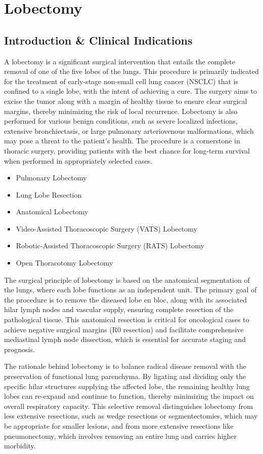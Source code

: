 \chapter{Lobectomy}

\section*{Introduction \& Clinical Indications}
A lobectomy is a significant surgical intervention that entails the complete removal of one of the five lobes of the lungs. This procedure is primarily indicated for the treatment of early-stage non-small cell lung cancer (NSCLC) that is confined to a single lobe, with the intent of achieving a cure. The surgery aims to excise the tumor along with a margin of healthy tissue to ensure clear surgical margins, thereby minimizing the risk of local recurrence. Lobectomy is also performed for various benign conditions, such as severe localized infections, extensive bronchiectasis, or large pulmonary arteriovenous malformations, which may pose a threat to the patient's health. The procedure is a cornerstone in thoracic surgery, providing patients with the best chance for long-term survival when performed in appropriately selected cases.

\begin{itemize}
  \item Pulmonary Lobectomy
  \item Lung Lobe Resection
  \item Anatomical Lobectomy
  \item Video-Assisted Thoracoscopic Surgery (VATS) Lobectomy
  \item Robotic-Assisted Thoracoscopic Surgery (RATS) Lobectomy
  \item Open Thoracotomy Lobectomy
\end{itemize}

The surgical principle of lobectomy is based on the anatomical segmentation of the lungs, where each lobe functions as an independent unit. The primary goal of the procedure is to remove the diseased lobe en bloc, along with its associated hilar lymph nodes and vascular supply, ensuring complete resection of the pathological tissue. This anatomical resection is critical for oncological cases to achieve negative surgical margins (R0 resection) and facilitate comprehensive mediastinal lymph node dissection, which is essential for accurate staging and prognosis.

The rationale behind lobectomy is to balance radical disease removal with the preservation of functional lung parenchyma. By ligating and dividing only the specific hilar structures supplying the affected lobe, the remaining healthy lung lobes can re-expand and continue to function, thereby minimizing the impact on overall respiratory capacity. This selective removal distinguishes lobectomy from less extensive resections, such as wedge resections or segmentectomies, which may be appropriate for smaller lesions, and from more extensive resections like pneumonectomy, which involves removing an entire lung and carries higher morbidity.


